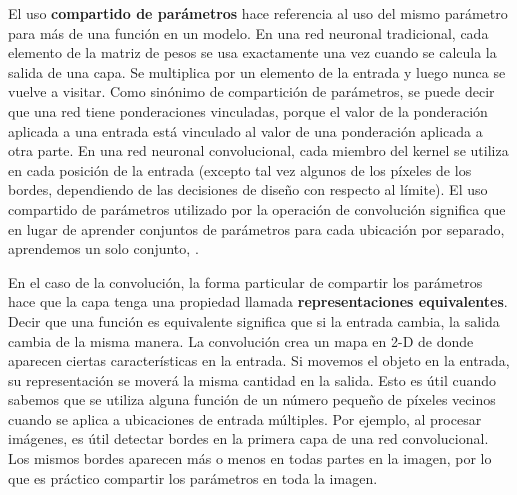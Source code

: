 		\vskip 0.4cm  
		
		El uso {\bf compartido de parámetros} hace referencia al uso del mismo parámetro para más de una función en un modelo. En una red neuronal tradicional, cada elemento de la matriz de pesos se usa exactamente una vez cuando se calcula la salida de una capa. Se multiplica por un elemento de la entrada y luego nunca se vuelve a visitar. Como sinónimo de compartición de parámetros, se puede decir que una red tiene ponderaciones vinculadas, porque el valor de la ponderación aplicada a una entrada está vinculado al valor de una ponderación aplicada a otra parte. En una red neuronal convolucional, cada miembro del kernel se utiliza en cada posición de la entrada (excepto tal vez algunos de los píxeles de los bordes, dependiendo de las decisiones de diseño con respecto al límite). El uso compartido de parámetros utilizado por la operación de convolución significa que en lugar de aprender conjuntos de parámetros para cada ubicación por separado, aprendemos un solo conjunto, \citep{Goodfellow-et-al-2016}.
		\vskip 0.4cm  

		En el caso de la convolución, la forma particular de compartir los parámetros hace que la capa tenga una propiedad llamada {\bf representaciones equivalentes}. Decir que una función es equivalente significa que si la entrada cambia, la salida cambia de la misma manera.
		La convolución crea un mapa en 2-D de donde aparecen ciertas características en la entrada. Si movemos el objeto en la entrada, su representación se moverá la misma cantidad en la salida. Esto es útil cuando sabemos que se utiliza alguna función de un número pequeño de píxeles vecinos cuando se aplica a ubicaciones de entrada múltiples. Por ejemplo, al procesar imágenes, es útil detectar bordes en la primera capa de una red convolucional. Los mismos bordes aparecen más o menos en todas partes en la imagen, por lo que es práctico compartir los parámetros en toda la imagen.

